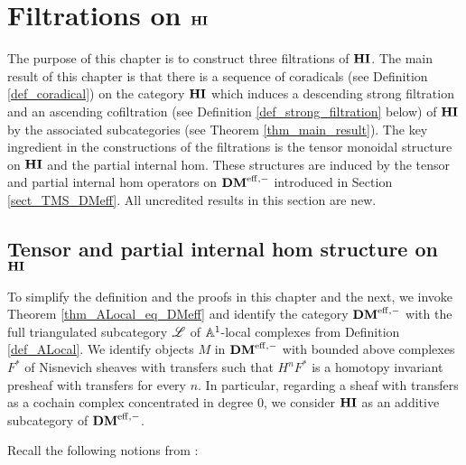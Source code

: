 \newpage
\chapter{Filtrations on $\mathbf{HI}$}\label{sect_filtration_hi}

The purpose of this chapter is to construct three filtrations of 
$\mathbf{HI}$. The main result of this chapter is that
there is a sequence of coradicals (see Definition 
\ref{def_coradical}) on the category $\mathbf{HI}$ which induces a 
descending strong filtration and an ascending cofiltration (see 
Definition \ref{def_strong_filtration} below) of $\mathbf{HI}$ by the 
associated subcategories (see Theorem \ref{thm_main_result}). The 
key ingredient in the constructions of the filtrations is the 
tensor monoidal structure on $\mathbf{HI}$ and the partial internal hom. 
These structures are induced by the tensor and partial 
internal hom operators on $\mathbf{DM}^{\mathrm{eff},-}$ introduced in Section 
\ref{sect_TMS_DMeff}. All uncredited results in this section are new.

\section{Tensor and partial internal hom structure on $\mathbf{HI}$}

To simplify the definition and the proofs in this chapter and the
next, we invoke Theorem \ref{thm_ALocal_eq_DMeff} and identify the 
category $\mathbf{DM}^{\mathrm{eff},-}$ with the full triangulated subcategory $\mathscr{L}$ 
of $\mathbb{A}^1$-local complexes from Definition \ref{def_ALocal}. We identify 
objects $M$ in $\mathbf{DM}^{\mathrm{eff},-}$ with bounded above complexes $F^*$ of 
Nisnevich sheaves with transfers such that $H^nF^*$ is a homotopy 
invariant presheaf with transfers for every $n$. In particular, 
regarding a sheaf with transfers as a cochain complex concentrated 
in degree 0, we consider $\mathbf{HI}$ as an additive subcategory of 
$\mathbf{DM}^{\mathrm{eff},-}$.

Recall the following notions from \cite[1.3]{BBD}:

